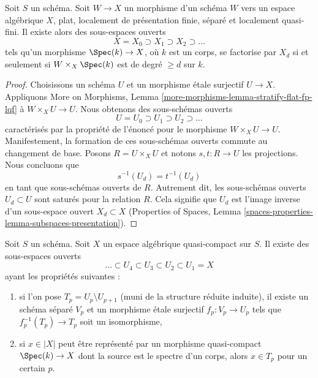 \begin{lemma}
\label{lemma-stratify-flat-fp-lqf}
Soit $S$ un schéma. Soit $W \to X$ un morphisme d'un schéma $W$
vers un espace algébrique $X$, plat, localement de présentation finie,
séparé et localement quasi-fini. Il existe alors des sous-espaces ouverts
$$
X = X_0 \supset X_1 \supset X_2 \supset \ldots
$$
tels qu'un morphisme $\Spec(k) \to X$, où $k$ est un corps,
se factorise par $X_d$ si et seulement si
$W \times_X \Spec(k)$ est de degré $\geq d$ sur $k$.
\end{lemma}

\begin{proof}
Choisissons un schéma $U$ et un morphisme étale surjectif $U \to X$.
Appliquons More on Morphisms, Lemma
\ref{more-morphisms-lemma-stratify-flat-fp-lqf}
à $W \times_X U \to U$. Nous obtenons des sous-schémas ouverts
$$
U = U_0 \supset U_1 \supset U_2 \supset \ldots
$$
caractérisés par la propriété de l'énoncé pour le morphisme
$W \times_X U \to U$. Manifestement, la formation de ces sous-schémas ouverts
commute au changement de base. Posons $R = U \times_X U$ et notons
$s, t : R \to U$ les projections. Nous concluons que
$$
s^{-1}(U_d) = t^{-1}(U_d)
$$
en tant que sous-schémas ouverts de $R$. Autrement dit, les sous-schémas
ouverts $U_d \subset U$ sont saturés pour la relation $R$. Cela signifie que
$U_d$ est l'image inverse d'un sous-espace ouvert $X_d \subset X$
(Properties of Spaces, Lemma
\ref{spaces-properties-lemma-subspaces-presentation}).
\end{proof}

\begin{lemma}
\label{lemma-filter-quasi-compact}
Soit $S$ un schéma. Soit $X$ un espace algébrique quasi-compact sur $S$.
Il existe des sous-espaces ouverts
$$
\ldots \subset U_4 \subset U_3 \subset U_2 \subset U_1 = X
$$
ayant les propriétés suivantes :
\begin{enumerate}
\item si l'on pose $T_p = U_p \setminus U_{p + 1}$ (muni de la structure
réduite induite), il existe un schéma séparé $V_p$ et un morphisme étale
surjectif $f_p : V_p \to U_p$ tels que $f_p^{-1}(T_p) \to T_p$ soit un
isomorphisme,
\item si $x \in |X|$ peut être représenté par un morphisme quasi-compact
$\Spec(k) \to X$ dont la source est le spectre d'un corps, alors
$x \in T_p$ pour un certain $p$.
\end{enumerate}
\end{lemma}

